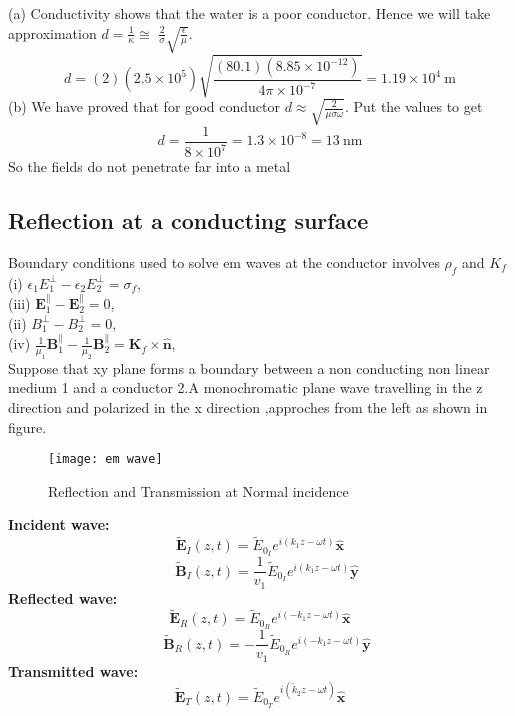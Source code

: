 \begin{answer}
 (a) Conductivity shows that the water is a poor conductor. Hence we will take approximation $d=\frac{1}{\kappa} \cong$ $\frac{2}{\sigma} \sqrt{\frac{\epsilon}{\mu}} .$
$$
d=(2)\left(2.5 \times 10^{5}\right) \sqrt{\frac{(80.1)\left(8.85 \times 10^{-12}\right)}{4 \pi \times 10^{-7}}}=1.19 \times 10^{4} \mathrm{~m}
$$
(b) We have proved that for good conductor $d \approx \sqrt{\frac{2}{\mu \sigma \omega}}$. Put the values to get
$$
d=\frac{1}{8 \times 10^{7}}=1.3 \times 10^{-8}=13 \mathrm{~nm}
$$
So the fields do not penetrate far into a metal	
\end{answer}
\subsection{Reflection at a conducting surface}
Boundary conditions used to solve em waves at the conductor involves $\rho_f$ and $K_f$\\
(i) $\epsilon_{1} E_{1}^{\perp}-\epsilon_{2} E_{2}^{\perp}=\sigma_{f}$,\\
(iii) $\mathbf{E}_{1}^{\|}-\mathbf{E}_{2}^{\|}=0$,\\
(ii) $B_{1}^{\perp}-B_{2}^{\perp}=0$,\\
(iv) $\frac{1}{\mu_{1}} \mathbf{B}_{1}^{\|}-\frac{1}{\mu_{2}} \mathbf{B}_{2}^{\|}=\mathbf{K}_{f} \times \hat{\mathbf{n}}$,\\
Suppose that xy plane forms a boundary between a non conducting non linear medium 1 and a conductor 2.A monochromatic plane wave travelling in the z direction and polarized in the x direction ,approches from the left as shown in figure.\\
\begin{figure}[H]
	\centering
	\texttt{[image: em wave]}
	\caption{Reflection and Transmission at Normal incidence}
	\label{Reflection and Transmission at Normal incidence}
\end{figure}
\textbf{Incident wave:}
$$\tilde{\mathbf{E}}_{I}(z, t)=\tilde{E}_{0_{I}} e^{i\left(k_{1} z-\omega t\right)} \hat{\mathbf{x}}$$
$$ \quad \tilde{\mathbf{B}}_{I}(z, t)=\frac{1}{v_{1}} \tilde{E}_{0_{I}} e^{i\left(k_{1} z-\omega t\right)} \hat{\mathbf{y}}$$
\textbf{Reflected wave:}
$$\tilde{\mathbf{E}}_{R}(z, t)=\tilde{E}_{0_{R}} e^{i\left(-k_{1} z-\omega t\right)} \hat{\mathbf{x}}$$
$$ \quad \tilde{\mathbf{B}}_{R}(z, t)=-\frac{1}{v_{1}} \tilde{E}_{0_{R}} e^{i\left(-k_{1} z-\omega t\right)} \hat{\mathbf{y}}$$
\textbf{Transmitted wave:}
$$\tilde{\mathbf{E}}_{T}(z, t)=\tilde{E}_{0_{T}} e^{i\left(\tilde{k}_{2} z-\omega t\right)} \hat{\mathbf{x}}$$
